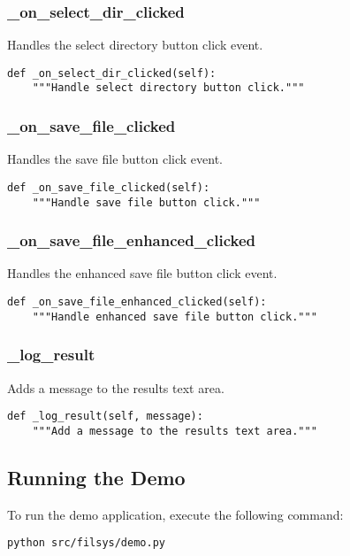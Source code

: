 \subsubsection{\_on\_select\_dir\_clicked}

Handles the select directory button click event.

\begin{verbatim}
def _on_select_dir_clicked(self):
    """Handle select directory button click."""
\end{verbatim}

\subsubsection{\_on\_save\_file\_clicked}

Handles the save file button click event.

\begin{verbatim}
def _on_save_file_clicked(self):
    """Handle save file button click."""
\end{verbatim}

\subsubsection{\_on\_save\_file\_enhanced\_clicked}

Handles the enhanced save file button click event.

\begin{verbatim}
def _on_save_file_enhanced_clicked(self):
    """Handle enhanced save file button click."""
\end{verbatim}

\subsubsection{\_log\_result}

Adds a message to the results text area.

\begin{verbatim}
def _log_result(self, message):
    """Add a message to the results text area."""
\end{verbatim}

\subsection{Running the Demo}

To run the demo application, execute the following command:

\begin{verbatim}
python src/filsys/demo.py
\end{verbatim}

